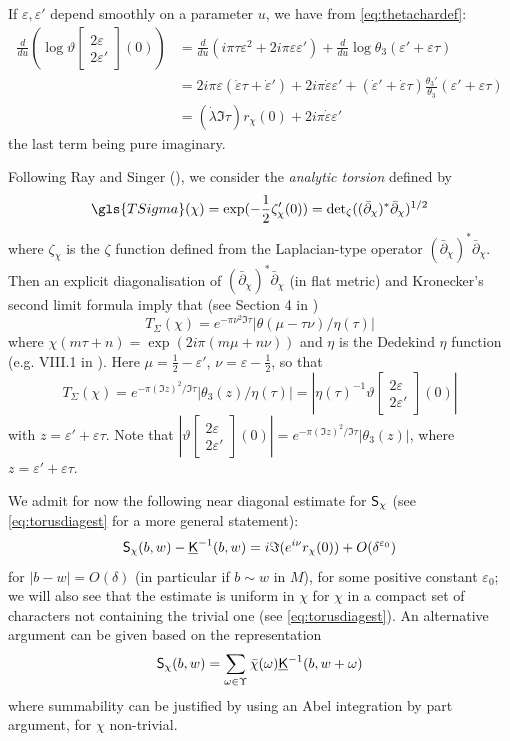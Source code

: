 \documentclass[10pt]{article}
\newcommand{\eps}{\varepsilon}
\newcommand{\uK}{{\underline {\sf K}}}
\newcommand{\rS}{{\sf S}}
\newcommand{\dbar}{\bar\partial}
\newcommand{\thetaf}[2]{\vartheta\left [\begin{array}{c}#1\\#2\end{array}\right]}
\begin{document}
If $\eps,\eps'$ depend smoothly on a parameter $u$, we have from \eqref{eq:thetachardef}:
\begin{align*}
\frac{d}{du}\left(\log\thetaf{2\eps}{2\eps'}(0)\right)&=\frac{d}{du}(i\pi\tau\eps^2+2i\pi\eps\eps')+\frac{d}{du}\log\theta_3(\eps'+\eps\tau)\\
&=2i\pi\eps(\dot\eps\tau+\dot\eps')+2i\pi\dot\eps\eps'+(\dot\eps'+\dot\eps\tau)\frac{\theta_3'}{\theta_3}(\eps'+\eps\tau)\\
&=(\dot\lambda\Im\tau) r_\chi(0)+2i\pi\dot\eps\eps'
\end{align*}
the last term being pure imaginary. 

Following Ray and Singer (\cite{RS_analytic}),  we consider the {\em analytic torsion} defined by
$$\gls{TSigma}(\chi)=\exp(-\frac 12\zeta_\chi'(0))={\det}_\zeta((\dbar_\chi)^*\dbar_\chi)^{1/2}$$
where $\zeta_\chi$ is the $\zeta$ function defined from the Laplacian-type operator $(\dbar_\chi)^*\dbar_\chi$. Then an explicit diagonalisation of $(\dbar_\chi)^*\dbar_\chi$ (in flat metric) and Kronecker's second limit formula imply that (see Section 4 in \cite{RS_analytic})  
$$T_\Sigma(\chi)=e^{-\pi\nu^2\Im\tau}|\theta(\mu-\tau\nu)/\eta(\tau)|$$
where $\chi(m\tau+n)=\exp(2i\pi(m\mu+n\nu))$ and $\eta$ is the  Dedekind $\eta$ function (e.g. VIII.1 in \cite{Chandra}). Here $\mu=\frac 12-\eps'$, $\nu=\eps-\frac 12$, so that
$$T_\Sigma(\chi)=e^{-\pi(\Im z)^2/\Im\tau}|\theta_3(z)/\eta(\tau)|=\left|\eta(\tau)^{-1}\thetaf{2\eps}{2\eps'}(0)\right|$$
with $z=\eps'+\eps\tau$. Note that $\left|\thetaf{2\eps}{2\eps'}(0)\right|=e^{-\pi(\Im z)^2/\Im\tau}|\theta_3(z)|$, where $z=\eps'+\eps\tau$.

%
%
%
%
%

%


%
%
%
%
%
%
%

%
%
%
%
%
%
%
%
%
%
%

We admit for now the following near diagonal estimate for $\rS_\chi$ (see \eqref{eq:torusdiagest} for a more general statement): 
$$\rS_\chi(b,w)-\uK^{-1}(b,w)=i\Im(e^{i\nu}r_\chi(0))+O(\delta^{\eps_0})$$
for $|b-w|=O(\delta)$ (in particular if $b\sim w$ in $M$), for some positive constant $\eps_0$; we will also see that the estimate is uniform in $\chi$ for $\chi$ in a compact set of characters not containing the trivial one (see \eqref{eq:torusdiagest}). An alternative argument can be given based on the representation
$$\rS_\chi(b,w)=\sum_{\omega\in\Upsilon}\bar\chi(\omega)\uK^{-1}(b,w+\omega)$$
where summability can be justified by using an Abel integration by part argument, for $\chi$ non-trivial.
\end{document}
